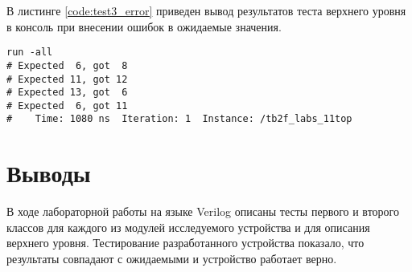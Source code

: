 В листинге \ref{code:test3_error} приведен вывод результатов теста верхнего уровня в консоль при внесении ошибок в ожидаемые значения.
\begin{lstlisting}[caption=Результаты ошибочного теста второго класса с чтением файлов, label=code:test3_error, style=console]
run -all
# Expected  6, got  8
# Expected 11, got 12
# Expected 13, got  6
# Expected  6, got 11
#    Time: 1080 ns  Iteration: 1  Instance: /tb2f_labs_11top
\end{lstlisting}

\section{Выводы}

В ходе лабораторной работы на языке Verilog описаны тесты первого и второго классов для каждого из модулей исследуемого устройства и для описания верхнего уровня. Тестирование разработанного устройства показало, что результаты совпадают с ожидаемыми и устройство работает верно.

